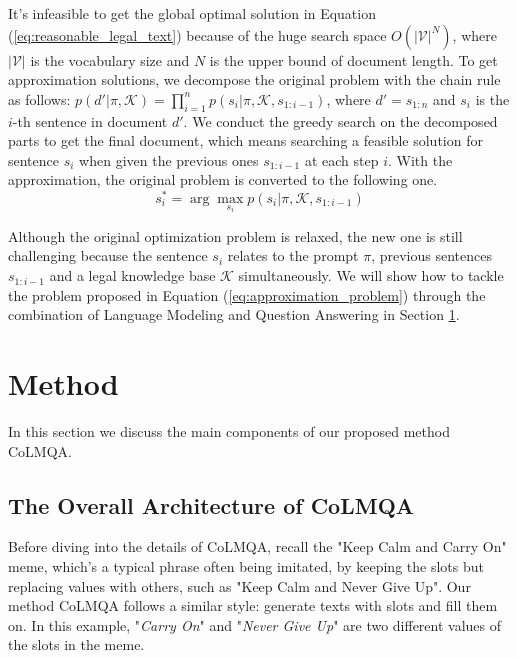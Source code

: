 \documentclass{article}
\begin{document}
It's infeasible to get the global optimal solution in Equation (\ref{eq:reasonable_legal_text}) because of the huge search space $O(|\mathcal{V}|^{N})$, where $|\mathcal{V}|$ is the vocabulary size and $N$ is the upper bound of document length. 
To get approximation solutions, we decompose the original problem with the chain rule as follows: $p(d'|\pi, \mathcal{K})=\prod_{i=1}^{n} p(s_i|\pi, \mathcal{K}, s_{1:i-1})$, where $d'=s_{1:n}$ and $s_i$ is the $i$-th sentence in document $d'$. 
We conduct the greedy search on the decomposed parts to get the final document, which means searching a feasible solution for sentence $s_i$ when given the previous ones $s_{1:i-1}$ at each step $i$. 
With the approximation, the original problem is converted to the following one. 
\begin{equation}
	s_i^* = \arg \max_{s_i} p(s_i | \pi, \mathcal{K}, s_{1:i-1})
\label{eq:approximation_problem}
\end{equation}

Although the original optimization problem is relaxed, the new one is still challenging because the sentence $s_i$ relates to the prompt $\pi$, previous sentences $s_{1:i-1}$ and a legal knowledge base $\mathcal{K}$ simultaneously. 
We will show how to tackle the problem proposed in Equation (\ref{eq:approximation_problem}) through the combination of Language Modeling and Question Answering in Section \ref{sec:method}.

\section{Method}
\label{sec:method}
In this section we discuss the main components of our proposed method CoLMQA. 

\subsection{The Overall Architecture of CoLMQA}
Before diving into the details of CoLMQA, recall the "Keep Calm and Carry On" meme, which's a typical phrase often being imitated, by keeping the slots but replacing values with others, such as "Keep Calm and Never Give Up". 
Our method CoLMQA follows a similar style: generate texts with slots and fill them on. 
In this example, "\textit{Carry On}" and "\textit{Never Give Up}" are two different values of the slots in the meme. 
\end{document}
